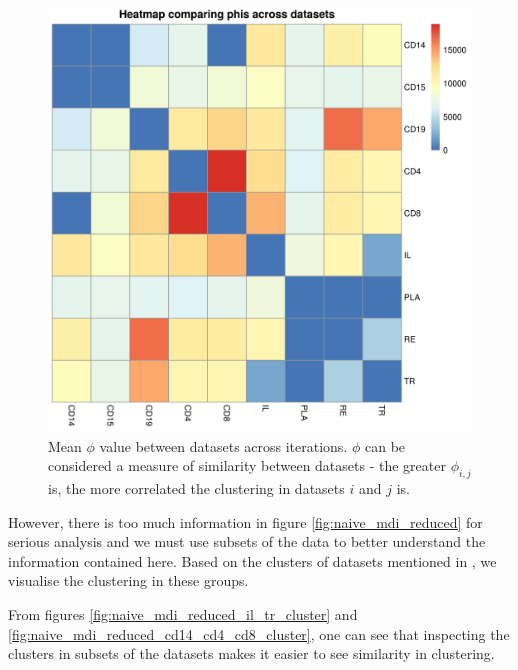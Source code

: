 \documentclass[12pt]{article} %
\begin{document}
	\begin{figure}[h]
		\centering
		\includegraphics[scale=0.75]{Images/Initial_analysis/Phi_heatmap_1.png}
		\caption{Mean $\phi$ value between datasets across iterations. $\phi$ can be considered a measure of similarity between datasets - the greater $\phi_{i,j}$ is, the more correlated the clustering in datasets $i$ and $j$ is.}
		\label{fig:naive_mdi_reduced_phi_heatmap}
	\end{figure}
	
	However, there is too much information in figure \ref{fig:naive_mdi_reduced} for serious analysis and we must use subsets of the data to better understand the information contained here. Based on the clusters of datasets mentioned in \label{list:datasets_naive_mdi_reduced}, we visualise the clustering in these groups.
	
	From figures \ref{fig:naive_mdi_reduced_il_tr_cluster} and \ref{fig:naive_mdi_reduced_cd14_cd4_cd8_cluster}, one can see that inspecting the clusters in subsets of the datasets makes it easier to see similarity in clustering.
	
	
\end{document}
